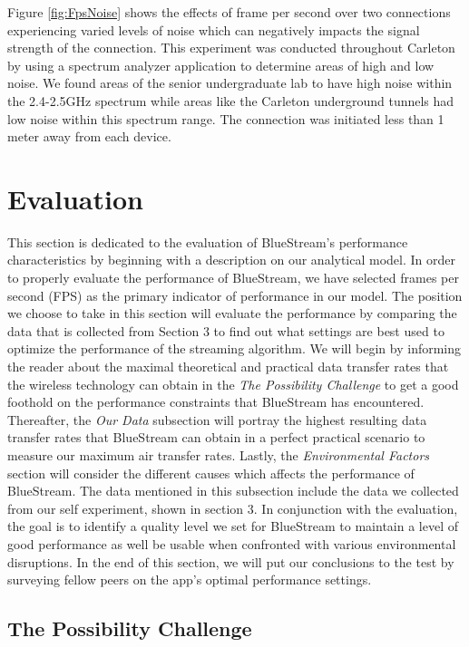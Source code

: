 \documentclass[a4paper,12pt]{article}
\begin{document}
Figure \ref{fig:FpsNoise} shows the effects of frame per second over two connections experiencing varied levels of noise which can negatively impacts the signal strength of the connection. This experiment was conducted throughout Carleton by using a spectrum analyzer application to determine areas of high and low noise. We found areas of the senior undergraduate lab to have high noise within the 2.4-2.5GHz spectrum while areas like the Carleton underground tunnels had low noise within this spectrum range. The connection was initiated less than 1 meter away from each device.

\section{Evaluation}
This section is dedicated to the evaluation of BlueStream’s performance characteristics by beginning with a description on our analytical model. In order to properly evaluate the performance of BlueStream, we have selected frames per second (FPS) as the primary indicator of performance in our model. The position we choose to take in this section will evaluate the performance by comparing the data that is collected from Section 3 to find out what settings are best used to optimize the performance of the streaming algorithm. We will begin by informing the reader about the maximal theoretical and practical data transfer rates that the wireless technology can obtain in the \textit{The Possibility Challenge} to get a good foothold on the performance constraints that BlueStream has encountered. Thereafter, the \textit{Our Data} subsection will portray the highest resulting data transfer rates that BlueStream can obtain in a perfect practical scenario to measure our maximum air transfer rates. Lastly, the \textit{Environmental Factors} section will consider the different causes which affects the performance of BlueStream. The data mentioned in this subsection include the data we collected from our self experiment, shown in section 3. In conjunction with the evaluation, the goal is to identify a quality level we set for BlueStream to maintain a level of good performance as well be usable when confronted with various environmental disruptions. In the end of this section, we will put our conclusions to the test by surveying fellow peers on the app’s optimal performance settings. 

\subsection{The Possibility Challenge}
\end{document}
